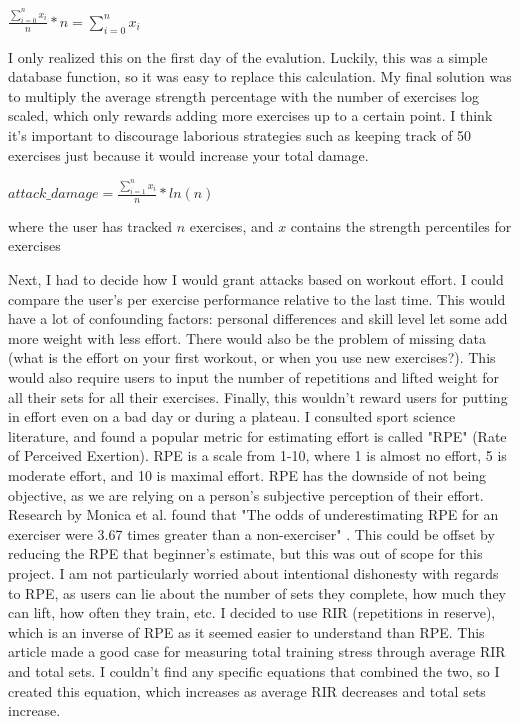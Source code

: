 \documentclass{l4proj}
\begin{document}
\begin{algorithm}[H]
  $\frac{\sum_{i=0}^{n} x_i}{n} * n = {\sum_{i=0}^{n} x_i}$
\end{algorithm}

I only realized this on the first day of the evalution. Luckily, this was a simple database function, so it was easy to replace this calculation. My final solution was to multiply the average strength percentage with the number of exercises log scaled, which only rewards adding more exercises up to a certain point. I think it's important to discourage laborious strategies such as keeping track of 50 exercises just because it would increase your total damage. 

\begin{algorithm}
  $attack\_damage = \frac{\sum_{i=1}^{n} x_i}{n} * ln(n) $

  where the user has tracked $n$ exercises, and $x$ contains the strength percentiles for exercises 
\end{algorithm}

Next, I had to decide how I would grant attacks based on workout effort. I could compare the user's per exercise performance relative to the last time. This would have a lot of confounding factors: personal differences and skill level let some add more weight with less effort. There would also be the problem of missing data (what is the effort on your first workout, or when you use new exercises?). This would also require users to input the number of repetitions and lifted weight for all their sets for all their exercises. Finally, this wouldn't reward users for putting in effort even on a bad day or during a plateau. I consulted sport science literature, and found a popular metric for estimating effort is called "RPE" (Rate of Perceived Exertion). RPE is a scale from 1-10, where 1 is almost no effort, 5 is moderate effort, and 10 is maximal effort. RPE has the downside of not being objective, as we are relying on a person's subjective perception of their effort. Research by Monica et al. found that "The odds of underestimating RPE for an exerciser were 3.67 times greater than a non-exerciser" \cite{RPE_estimations}. This could be offset by reducing the RPE that beginner's estimate, but this was out of scope for this project. I am not particularly worried about intentional dishonesty with regards to RPE, as users can lie about the number of sets they complete, how much they can lift, how often they train, etc. I decided to use RIR (repetitions in reserve), which is an inverse of RPE as it seemed easier to understand than RPE. This article \cite{rir} made a good case for measuring total training stress through average RIR and total sets. I couldn't find any specific equations that combined the two, so I created this equation, which increases as average RIR decreases and total sets increase.
\end{document}
